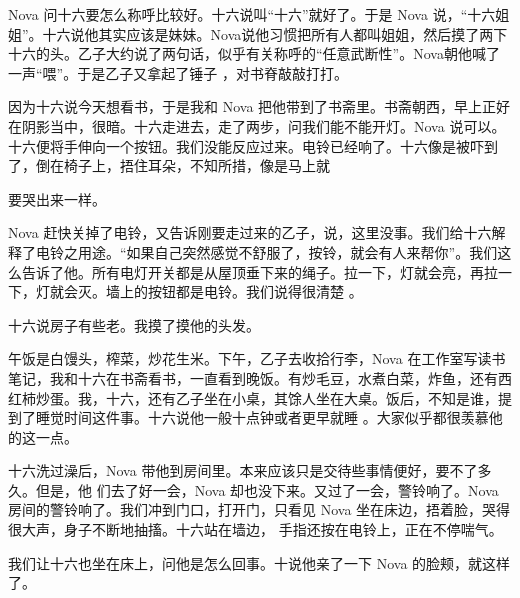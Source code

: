 \documentclass{article}
\begin{document}
Nova 问十六要怎么称呼比较好。十六说叫“十六”就好了。于是 Nova 说，“十六姐姐”。十六说他其实应该是妹妹。Nova说他习惯把所有人都叫姐姐，然后摸了两下十六的头。乙子大约说了两句话，似乎有关称呼的“任意武断性”。Nova朝他喊了一声“喂”。于是乙子又拿起了锤子
，对书脊敲敲打打。 

因为十六说今天想看书，于是我和 Nova 把他带到了书斋里。书斋朝西，早上正好在阴影当中，很暗。十六走进去，走了两步，问我们能不能开灯。Nova 说可以。十六便将手伸向一个按钮。我们没能反应过来。电铃已经响了。十六像是被吓到了，倒在椅子上，捂住耳朵，不知所措，像是马上就

\newpage
要哭出来一样。 

Nova 赶快关掉了电铃，又告诉刚要走过来的乙子，说，这里没事。我们给十六解释了电铃之用途。“如果自己突然感觉不舒服了，按铃，就会有人来帮你”。我们这么告诉了他。所有电灯开关都是从屋顶垂下来的绳子。拉一下，灯就会亮，再拉一下，灯就会灭。墙上的按钮都是电铃。我们说得很清楚
。 


十六说房子有些老。我摸了摸他的头发。 

午饭是白馒头，榨菜，炒花生米。下午，乙子去收拾行李，Nova 在工作室写读书笔记，我和十六在书斋看书，一直看到晚饭。有炒毛豆，水煮白菜，炸鱼，还有西红柿炒蛋。我，十六，还有乙子坐在小桌，其馀人坐在大桌。饭后，不知是谁，提到了睡觉时间这件事。十六说他一般十点钟或者更早就睡
。大家似乎都很羡慕他的这一点。 

十六洗过澡后，Nova 带他到房间里。本来应该只是交待些事情便好，要不了多久。但是，他
\newpage
们去了好一会，Nova 却也没下来。又过了一会，警铃响了。Nova 房间的警铃响了。我们冲到门口，打开门，只看见 Nova 坐在床边，捂着脸，哭得很大声，身子不断地抽搐。十六站在墙边，
手指还按在电铃上，正在不停喘气。 

我们让十六也坐在床上，问他是怎么回事。十说他亲了一下 Nova 的脸颊，就这样了。
\end{document}
